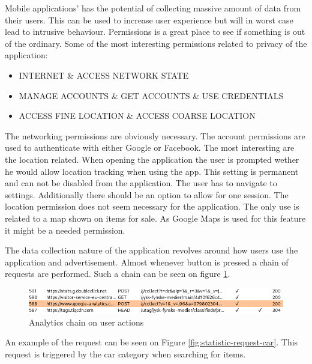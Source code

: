 Mobile applications' has the potential of collecting massive amount of data from their users. This can be used to increase user experience but will in worst case lead to intrusive behaviour. Permissions is a great place to see if something is out of the ordinary. Some of the most interesting permissions related to privacy of the application:  

\begin{itemize}
    \item INTERNET \& ACCESS NETWORK STATE
    \item MANAGE ACCOUNTS \& GET ACCOUNTS \& USE CREDENTIALS
    \item ACCESS FINE LOCATION \& ACCESS COARSE LOCATION
\end{itemize}

The networking permissions are obviously necessary. The account permissions are used to authenticate with either Google or Facebook. The most interesting are the location related. When opening the application the user is prompted wether he would allow location tracking when using the app. This setting is permanent and can not be disabled from the application. The user has to navigate to settings. Additionally there should be an option to allow for one session. The location permission does not seem necessary for the application. The only use is related to a map shown on items for sale. As Google Maps is used for this feature it might be a needed permission.

The data collection nature of the application revolves around how users use the application and advertisement. Almost whenever button is pressed a chain of requests are performed. Such a chain can be seen on figure \ref{fig:statistics-chain}. 

\begin{figure}[htbp]
    \centering
    \includegraphics[width=1\columnwidth]{../static-analysis/pictures/statistics_trackview_chain.png}
    \caption{Analytics chain on user actions}
    \label{fig:statistics-chain}
\end{figure}

An example of the request can be seen on Figure \ref{fig:statistic-request-car}. This request is triggered by the car category when searching for items.  


